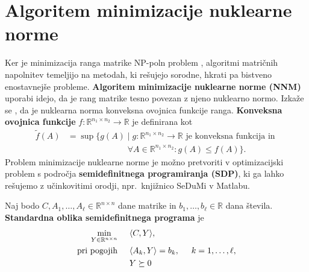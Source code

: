 \section{Algoritem minimizacije nuklearne norme} \label{1707-1755}
Ker je minimizacija ranga matrike NP-poln problem \cite{NNM-PHD}, algoritmi matričnih napolnitev temeljijo na metodah, ki rešujejo sorodne, hkrati pa bistveno enostavnejše probleme. \textbf{Algoritem minimizacije nuklearne norme (NNM)} uporabi idejo, da je rang matrike tesno povezan z njeno nuklearno normo.
Izkaže se \cite{NNM-PHD}, da je nuklearna norma konveksna ovojnica funkcije ranga. \textbf{Konveksna ovojnica funkcije} $f : \mathbb{R}^{n_1 \times n_2} \rightarrow \mathbb{R}$ je definirana kot 
\begin{align*}
    \tilde{f}(A) 
    &= \sup\{g(A) \mid g:\mathbb R^{n_1\times n_2}\to \mathbb R \text{ je konveksna funkcija in }\\ 
    &\hspace{3cm}\forall A\in \mathbb R^{n_1\times n_2}: g(A) \leq f(A) \}.
\end{align*}
Problem minimizacije nuklearne norme je možno pretvoriti v optimizacijski problem s področja \textbf{semidefinitnega programiranja (SDP)}, ki ga lahko rešujemo z učinkovitimi orodji, npr.\ knjižnico SeDuMi \cite{SeDuMi} v Matlabu.

Naj bodo $C,A_1,\ldots,A_\ell \in \mathbb{R}^{n \times n}$ dane matrike in $b_1,\ldots,b_\ell\in \mathbb R$ dana števila.
\textbf{Standardna oblika semidefinitnega programa} je
\begin{align}
\label{1007-1829} 
\begin{split}
    \min_{Y\in \mathbb R^{n\times n}} \hspace{0.5cm}             & \langle C, Y \rangle,                                                                         \\
    \text{pri pogojih} \hspace{0.5cm} & \langle A_k, Y \rangle = b_k, \hspace{0.5cm} k = 1, \hdots , \ell,\\
                                      & Y \succeq 0
\end{split}
\end{align}


